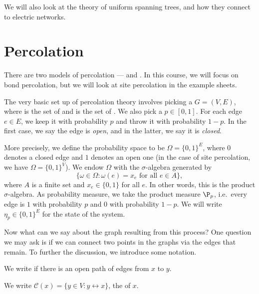 \documentclass[a4paper]{article}
\begin{document}
We will also look at the theory of uniform spanning trees, and how they connect to electric networks.

\section{Percolation}
There are two models of percolation ---  and . In this course, we will focus on bond percolation, but we will look at site percolation in the example sheets.

The very basic set up of percolation theory involves picking a  $G = (V, E)$, where  is the set of  and  is the set of . We also pick a  $p \in [0, 1]$. For each edge $e \in E$, we keep it with probability $p$ and throw it with probability $1 - p$. In the first case, we say the edge is \emph{open}, and in the latter, we say it is \emph{closed}.

More precisely, we define the probability space to be $\Omega= \{0, 1\}^E$, where $0$ denotes a closed edge and $1$ denotes an open one (in the case of site percolation, we have $\Omega = \{0, 1\}^V$). We endow $\Omega$ with the $\sigma$-algebra generated by 
\[
  \{\omega \in \Omega: \omega(e) = x_e \text{ for all }e \in A\},
\]
where $A$ is a finite set and $x_e \in \{0, 1\}$ for all $e$. In other words, this is the product $\sigma$-algebra. As probability measure, we take the product measure $\P_p$, i.e.\ every edge is $1$ with probability $p$ and $0$ with probability $1 - p$. We will write $\eta_p \in \{0, 1\}^E$ for the state of the system.

Now what can we say about the graph resulting from this process? One question we may ask is if we can connect two points in the graphs via the edges that remain. To further the discussion, we introduce some notation.

\begin{notation}
  We write  if there is an open path of edges from $x$ to $y$.
\end{notation}

\begin{notation}
  We write $\mathcal{C}(x) = \{y \in V: y \leftrightarrow x\}$, the  of $x$.
\end{notation}
\end{document}
